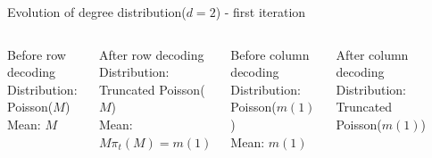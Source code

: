 \documentclass[10pt,xcolor=table]{beamer}
\begin{document}
	\begin{frame}{Evolution of degree distribution($d=2$) - first iteration}
	
	
		\begin{columns}
			
			{\vspace{-6mm}
				\hspace{6mm}
				\begin{block}{Before row decoding}
					{\color{blue}Distribution}: Poisson($M$) \\
					{\color{blue}Mean}: $M$
				\end{block}}
				
				\begin{block}{After row decoding}
					{\color{blue}Distribution}: Truncated Poisson($M$) \\
					{\color{blue}Mean}: $M \pi_t(M) = m(1)$
				\end{block}
				
				\begin{block}{Before column decoding}
					{\color{blue}Distribution}: Poisson($m(1)$) \\
					{\color{blue}Mean}: $m(1)$
				\end{block}
				
				\begin{block}{After column decoding}
					{\color{blue}Distribution}: Truncated Poisson($m(1)$) \\
				\end{block}
				
				
				\begin{center}
					\vspace{-3mm}
					
					
					
					
				\end{center}
				
			\end{columns}
		\end{frame}
\end{document}
